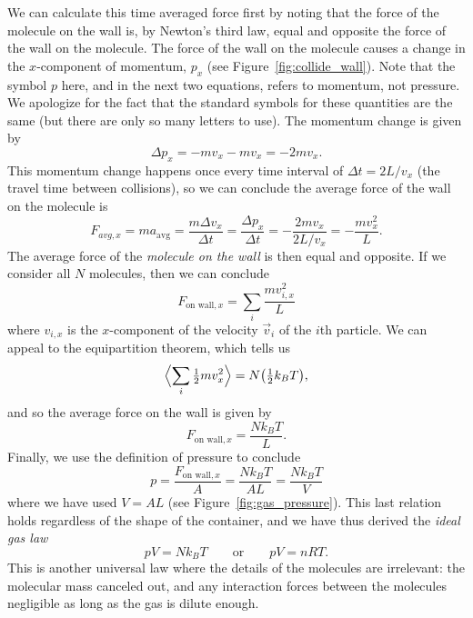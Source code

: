 We can calculate this time averaged force first by noting that the force
of the molecule on the wall is, by Newton's third law, equal and opposite
the force of the wall on the molecule.  The force of the wall on the molecule
causes a change in the $x$-component of momentum, $p_x$ (see 
Figure~\ref{fig:collide_wall}).  Note that the symbol $p$ here, and in the 
next two equations,  refers to momentum, not pressure. We apologize for 
the fact that the standard symbols for these quantities are the same
(but there are only so many letters to use).  The momentum change is 
given by 
\begin{equation}
\Delta  p_x  = - mv_x - m v_x = -2mv_x.
\end{equation}
This momentum change happens once every time interval of $\Delta t =
2L/v_x$ (the travel time between collisions), so we can conclude the
average force of the wall on the molecule is
\begin{equation}
F_{{ avg},x} = m a_\text{avg}= \frac{m \Delta v_x}{\Delta t} =\frac{\Delta p_x}{\Delta t} = -\frac{2mv_x}{2L/v_x} =
-\frac{mv_x^2}{L}.
\end{equation}
The average force of the \textit{molecule on the wall} is then
equal and opposite.  If we consider all $N$ molecules, then we can
conclude
\begin{equation}
F_{\text{on wall},x} = \sum_i \frac{m v_{i,x}^2}{L}
\end{equation}
where $v_{i,x}$ is the $x$-component of the velocity $\vec v_i$ of the
$i$th particle.
We can appeal to the equipartition theorem, which tells us
\begin{equation}
\Bigl\langle\sum_i {\textstyle\frac{1}{2}} m v_x^2\Bigr\rangle = N
\bigl({\textstyle\frac{1}{2}}k_BT\bigr),
\end{equation}
and so the average force on the wall is given by
\begin{equation}
F_{\text{on wall},x} = \frac{Nk_BT}{L}.
\end{equation}
Finally, we use the definition of pressure to conclude
\begin{equation}
p = \frac{F_{\text{on wall},x}}{A} = \frac{Nk_BT}{AL} = \frac{Nk_BT}{V}
\end{equation}
where we have used $V=AL$ (see Figure~\ref{fig:gas_pressure}).  This
last relation holds regardless of the shape of the container, and we
have thus derived the \textit{ideal gas law}
\begin{equation}
pV = N k_BT \qquad \text{or}\qquad pV = nRT.
\label{eq:ideal_gas_law}
\end{equation}
This is another universal law where the details of the molecules are
irrelevant: the molecular mass canceled out, and any interaction
forces between the molecules negligible as long as the gas is dilute
enough.

